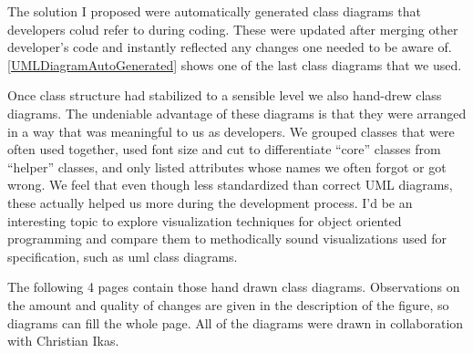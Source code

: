 The solution I proposed were automatically generated class diagrams that developers colud refer to during coding. These were updated after merging other developer's code and instantly reflected any changes one needed to be aware of. \autoref{UMLDiagramAutoGenerated} shows one of the last class diagrams that we used.


Once class structure had stabilized to a sensible level we also hand-drew class diagrams. The undeniable advantage of these diagrams is that they were arranged in a way that was meaningful to us as developers. We grouped classes that were often used together, used font size and cut to differentiate ``core'' classes from ``helper'' classes, and only listed attributes whose names we often forgot or got wrong. We feel that even though less standardized than correct UML diagrams, these actually helped us more during the development process. I'd be an interesting topic to explore visualization techniques for object oriented programming and compare them to methodically sound visualizations used for specification, such as \gls{uml} class diagrams.

The following 4 pages contain those hand drawn class diagrams. Observations on the amount and quality of changes are given in the description of the figure, so diagrams can fill the whole page. All of the diagrams were drawn in collaboration with Christian Ikas.




